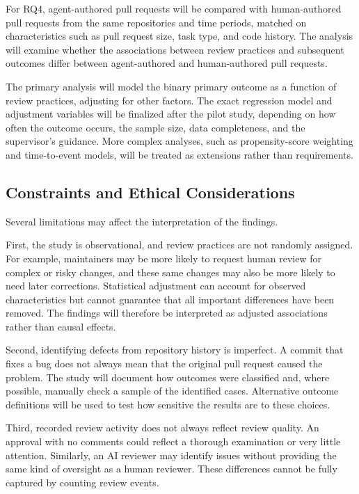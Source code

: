 \documentclass[stu,12pt,donotrepeattitle]{apa7}
\begin{document}
For RQ4, agent-authored pull requests will be compared with human-authored pull requests from the same repositories and time periods, matched on characteristics such as pull request size, task type, and code history. The analysis will examine whether the associations between review practices and subsequent outcomes differ between agent-authored and human-authored pull requests.

The primary analysis will model the binary primary outcome as a function of review practices, adjusting for other factors. The exact regression model and adjustment variables will be finalized after the pilot study, depending on how often the outcome occurs, the sample size, data completeness, and the supervisor's guidance. More complex analyses, such as propensity-score weighting and time-to-event models, will be treated as extensions rather than requirements.

\subsection{Constraints and Ethical Considerations}

Several limitations may affect the interpretation of the findings.

First, the study is observational, and review practices are not randomly assigned. For example, maintainers may be more likely to request human review for complex or risky changes, and these same changes may also be more likely to need later corrections. Statistical adjustment can account for observed characteristics but cannot guarantee that all important differences have been removed. The findings will therefore be interpreted as adjusted associations rather than causal effects.

Second, identifying defects from repository history is imperfect. A commit that fixes a bug does not always mean that the original pull request caused the problem. The study will document how outcomes were classified and, where possible, manually check a sample of the identified cases. Alternative outcome definitions will be used to test how sensitive the results are to these choices.

Third, recorded review activity does not always reflect review quality. An approval with no comments could reflect a thorough examination or very little attention. Similarly, an AI reviewer may identify issues without providing the same kind of oversight as a human reviewer. These differences cannot be fully captured by counting review events.
\end{document}
